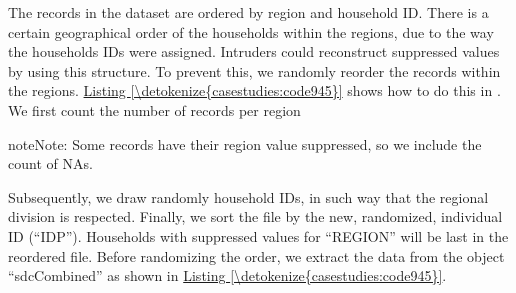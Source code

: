 \documentclass[letterpaper,10pt,english]{sphinxmanual}
\begin{document}

The records in the dataset are ordered by region and household ID. There
is a certain geographical order of the households within the regions,
due to the way the households IDs were assigned. Intruders could
reconstruct suppressed values by using this structure. To prevent this,
we randomly reorder the records within the regions. \hyperref[\detokenize{casestudies:code945}]{Listing \ref{\detokenize{casestudies:code945}}} shows
how to do this in . We first count the number of records per region

\begin{sphinxadmonition}{note}{Note:}
Some records have their region value suppressed, so we include the count of NAs.
\end{sphinxadmonition}

Subsequently, we draw randomly household IDs, in
such way that the regional division is respected. Finally, we sort the
file by the new, randomized, individual ID (“IDP”). Households with
suppressed values for “REGION” will be last in the reordered file.
Before randomizing the order, we extract the data from the 
object “sdcCombined” as shown in \hyperref[\detokenize{casestudies:code945}]{Listing \ref{\detokenize{casestudies:code945}}}.
\end{document}
